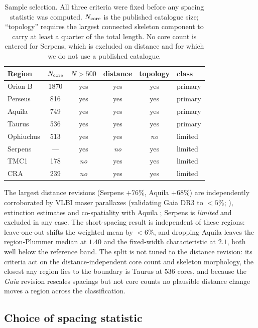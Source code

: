 \documentclass[usenatbib,twoside,twocolumn]{mnras}
\begin{document}
\begin{table}
\caption{Sample selection. All three criteria were fixed before any spacing statistic was computed. $N_{\rm core}$ is the published catalogue size; ``topology'' requires the largest connected skeleton component to carry at least a quarter of the total length. No core count is entered for Serpens, which is excluded on distance and for which we do not use a published catalogue.}
\label{tab:selection}
\footnotesize
\setlength{\tabcolsep}{4pt}
\begin{tabular}{lccccl}
\toprule
Region & $N_{\rm core}$ & $N>500$ & distance & topology & class \\
\midrule
Orion B   & 1870 & yes & yes & yes & primary \\
Perseus   & 816  & yes & yes & yes & primary \\
Aquila    & 749  & yes & yes & yes & primary \\
Taurus    & 536  & yes & yes & yes & primary \\
\midrule
Ophiuchus & 513  & yes & yes & \emph{no} & limited \\
Serpens   & ---  & yes & \emph{no} & yes & limited \\
TMC1      & 178  & \emph{no} & yes & yes & limited \\
CRA       & 239  & \emph{no} & yes & yes & limited \\
\bottomrule
\end{tabular}
\end{table} The largest distance revisions (Serpens $+76\%$, Aquila $+68\%$) are independently corroborated by VLBI maser parallaxes (validating Gaia DR3 to $<5\%$; \citealt{Kounkel2018,Xu2021,OrtizLeon2018,OrtizLeon2017}), extinction estimates \citep{Yan2022,Green2024} and co-spatiality with Aquila \citep{Zucker2020}; Serpens is \emph{limited} and excluded in any case. The short-spacing result is independent of these regions: leave-one-out shifts the weighted mean by $<6\%$, and dropping Aquila leaves the region-Plummer median at $1.40$ and the fixed-width characteristic at $2.1$, both well below the reference band. The split is not tuned to the distance revision: its criteria act on the distance-independent core count and skeleton morphology, the closest any region lies to the boundary is Taurus at $536$ cores, and because the \textit{Gaia} revision rescales spacings but not core counts no plausible distance change moves a region across the classification.

\subsection{Choice of spacing statistic}
\label{sec:statistics}
\end{document}
